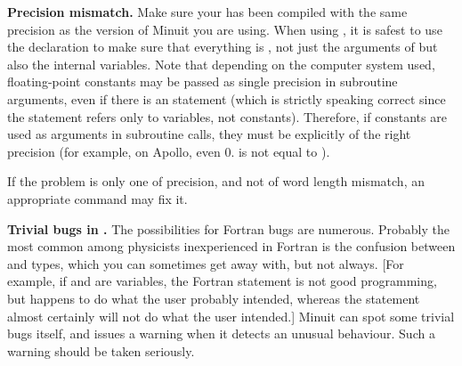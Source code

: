 \begin{UL}
\item {\bf Precision mismatch.}
      Make sure your  has been compiled with the same precision as the
      version of Minuit you are using.
      When using , it is safest to use the 
      declaration to make sure that everything is , not
      just the arguments of  but also the internal variables.
      Note that depending on the computer system used, floating-point
      constants may be passed as single precision in subroutine arguments,
      even if there is an  statement
      (which is strictly speaking correct since the  statement
      refers only to variables, not constants).
      Therefore, if constants are used as arguments in subroutine calls,
      they must be explicitly of the right precision (for example, on Apollo,
      even 0. is not equal to ).
       
      If the problem is only one of precision, and not of word length mismatch,
      an appropriate  command may fix it.
\item {\bf Trivial bugs in .}
      The possibilities for Fortran bugs are numerous. Probably the most
      common among physicists inexperienced in Fortran is the confusion
      between  and  types, 
      which you can sometimes get away with, but not always.
      [For example, if  and  are  variables, 
      the Fortran statement    is not good programming, 
      but happens to do what the user
      probably intended, whereas the statement      almost
      certainly will not do what the user intended.]
      Minuit can spot some trivial bugs itself, and issues
      a warning when it detects an unusual  behaviour.  Such a warning
      should be taken seriously.
       

\end{UL}
